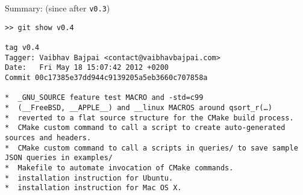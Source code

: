 Summary: (since after \lstinline!v0.3!)

\begin{lstlisting}
>> git show v0.4

tag v0.4
Tagger: Vaibhav Bajpai <contact@vaibhavbajpai.com>
Date:   Fri May 18 15:07:42 2012 +0200
Commit 00c17385e37dd944c9139205a5eb3660c707858a 

*  _GNU_SOURCE feature test MACRO and -std=c99
*  (__FreeBSD, __APPLE__) and __linux MACROS around qsort_r(…)
*  reverted to a flat source structure for the CMake build process.
*  CMake custom command to call a script to create auto-generated sources and headers.
*  CMake custom command to call a scripts in queries/ to save sample JSON queries in examples/
*  Makefile to automate invocation of CMake commands.
*  installation instruction for Ubuntu.
*  installation instruction for Mac OS X.
\end{lstlisting}

